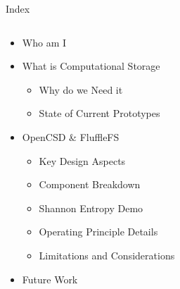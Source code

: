 \documentclass[aspectratio=169, notes]{beamer}
\begin{document}
\begin{frame}{Index}
    \begin{columns}
        \begin{column}{0.6\textwidth}
            \begin{itemize}
                \item Who am I
                \item What is Computational Storage
                \begin{itemize}
                    \item \footnotesize Why do we Need it
                    \item \footnotesize State of Current Prototypes
                \end{itemize}
                \item OpenCSD \& FluffleFS
                \begin{itemize}
                    \item \footnotesize Key Design Aspects
                    \item \footnotesize Component Breakdown
                    \item \footnotesize Shannon Entropy Demo
                    \item \footnotesize Operating Principle Details
                    \item \footnotesize Limitations and Considerations
                \end{itemize}
                \item Future Work
            \end{itemize}
        \end{column}
        \begin{column}{0.4\textwidth}
        \end{column}
    \end{columns}
\end{frame}
\end{document}
